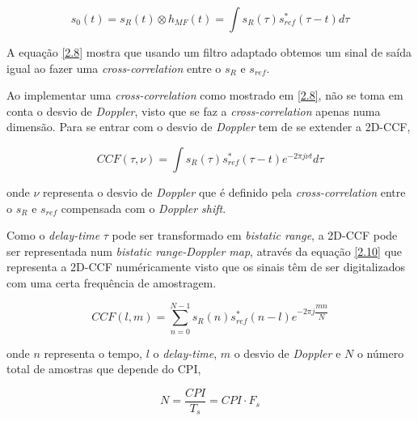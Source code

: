 \begin{equation} \label{2.8}
s_{0}\left( t\right) =s_{R}\left( t\right)\otimes h_{MF}\left( t\right) =\int s_{R}\left( \tau\right)s_{ref}^{\ast}\left(\tau -t\right)d\tau
\end{equation}

A equação \ref{2.8} mostra que usando um filtro adaptado obtemos um sinal de saída igual ao fazer uma \textit{cross-correlation} entre o $s_{R}$ e $s_{ref}$.\par 

Ao implementar uma \textit{cross-correlation} como mostrado em \ref{2.8}, não se toma em conta o desvio de \textit{Doppler}, visto que se faz a \textit{cross-correlation} apenas numa dimensão. Para se entrar com o desvio de \textit{Doppler} tem de se extender a \gls{2D-CCF},

\begin{equation} \label{2.9}
CCF\left( \tau,\nu\right) =\int s_{R}\left( \tau\right)s_{ref}^{\ast}\left(\tau -t\right)e^{-2\pi j\nu t}d\tau
\end{equation}

onde $\nu$ representa o desvio de \textit{Doppler} que é definido pela \textit{cross-correlation} entre o $s_{R}$ e $s_{ref}$ compensada com o \textit{Doppler shift}.\par
Como o \textit{delay-time} $\tau$ pode ser transformado em \textit{bistatic range}, a \gls{2D-CCF} pode ser representada num \textit{bistatic range-Doppler map}, através da equação \ref{2.10} que representa a \gls{2D-CCF} numéricamente visto que os sinais têm de ser digitalizados com uma certa frequência de amostragem.

\begin{equation} \label{2.10}
CCF\left(l,m\right) =\sum_{n=0}^{N-1} s_{R}\left( n\right)s_{ref}^{\ast}\left(n -l\right)e^{-2\pi j\dfrac{mn}{N}}
\end{equation}

onde $n$ representa o tempo, $l$ o \textit{delay-time}, $m$ o desvio de \textit{Doppler} e $N$ o número total de amostras que depende do \gls{CPI},

\begin{equation} \label{2.11}
N=\dfrac{CPI}{T_{s}}=CPI\cdot F_{s}
\end{equation}

